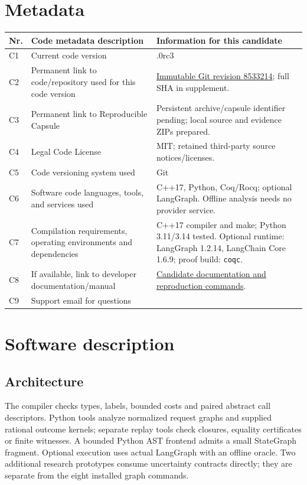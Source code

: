 \documentclass[preprint,12pt,a4paper]{elsarticle}
\newcommand{\SourceRevision}{8533214105aad0cc015ea1e1c2aad4057515aff7}
\newcommand{\Repo}{https://github.com/guyoverclocked/orchlang-compiler-design-project}
\begin{document}
\section*{Metadata}
\begingroup\small
\renewcommand{\arraystretch}{1.13}
\noindent\begin{tabularx}{\textwidth}{@{}l >{\raggedright\arraybackslash}p{4.3cm} >{\raggedright\arraybackslash}X@{}}
\toprule
Nr. & Code metadata description & Information for this candidate \\
\midrule
C1 & Current code version & 0.5.0rc3 \\
C2 & Permanent link to code/repository used for this code version & \href{\Repo/tree/\SourceRevision}{Immutable Git revision 8533214}; full SHA in supplement. \\
C3 & Permanent link to Reproducible Capsule & Persistent archive/capsule identifier pending; local source and evidence ZIPs prepared. \\
C4 & Legal Code License & MIT; retained third-party source notices/licenses. \\
C5 & Code versioning system used & Git \\
C6 & Software code languages, tools, and services used & C++17, Python, Coq/Rocq; optional LangGraph. Offline analysis needs no provider service. \\
C7 & Compilation requirements, operating environments and dependencies & C++17 compiler and make; Python 3.11/3.14 tested. Optional runtime: LangGraph 1.2.14, LangChain Core 1.6.9; proof build: \texttt{coqc}. \\
C8 & If available, link to developer documentation/manual & \href{\Repo/blob/\SourceRevision/docs/SCP_STRENGTHENING.md}{Candidate documentation and reproduction commands}. \\
C9 & Support email for questions & [Author confirmation required] \\
\bottomrule
\end{tabularx}
\endgroup

\section{Software description}
\subsection{Architecture}
The compiler checks types, labels, bounded costs and paired abstract call descriptors. Python tools analyze normalized request graphs and supplied rational outcome kernels; separate replay tools check closures, equality certificates or finite witnesses. A bounded Python AST frontend admits a small StateGraph fragment. Optional execution uses actual LangGraph with an offline oracle. Two additional research prototypes consume uncertainty contracts directly; they are separate from the eight installed graph commands.
\end{document}
